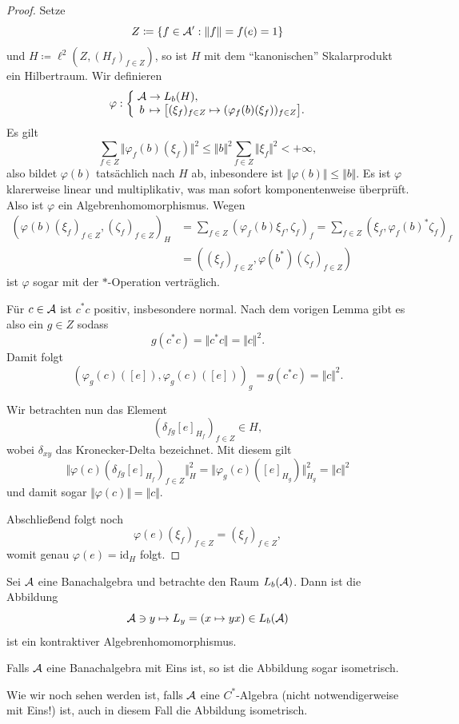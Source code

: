 \begin{proof}
    Setze
    $$ Z \coloneqq \{ f \in \mathcal{A}' : \Vert f \Vert = f(e) = 1 \} $$
    und $H \coloneq \ell^2(Z, (H_f)_{f \in Z})$, so ist $H$ mit dem ``kanonischen'' Skalarprodukt ein Hilbertraum. Wir definieren
    $$ \mapping{\varphi}{\Aa & \to & L_b(H),}{b & \mapsto & \big[ (\xi_f)_{f \in Z} \mapsto (\varphi_f(b)(\xi_f))_{f \in Z} \big].} $$
    Es gilt
    $$ \sum_{f \in Z} \Vert \varphi_f(b) (\xi_f) \Vert^2 \leq \Vert b \Vert^2 \sum_{f \in Z} \Vert \xi_f \Vert^2 < +\infty, $$
    also bildet $\varphi(b)$ tatsächlich nach $H$ ab, inbesondere ist $\Vert \varphi(b) \Vert \leq \Vert b \Vert$. Es ist $\varphi$ klarerweise linear und multiplikativ, was man sofort komponentenweise überprüft. Also ist $\varphi$ ein Algebrenhomomorphismus. Wegen
    \begin{align*}
        (\varphi(b)(\xi_f)_{f \in Z}, (\zeta_f)_{f \in Z})_H &= \sum_{f \in Z} (\varphi_f(b) \xi_f, \zeta_f)_f = \sum_{f \in Z} (\xi_f, \varphi_f(b)^* \zeta_f)_f \\
        &= ((\xi_f)_{f \in Z}, \varphi(b^*) (\zeta_f)_{f \in Z})
    \end{align*}
    ist $\varphi$ sogar mit der $\ast$-Operation verträglich.

    Für $c \in \mathcal{A}$ ist $c^* c$ positiv, insbesondere normal. Nach dem vorigen Lemma gibt es also ein $g \in Z$ sodass
    $$ g(c^* c) = \Vert c^* c \Vert = \Vert c \Vert^2. $$
    Damit folgt
    $$ (\varphi_g(c)([e]), \varphi_g(c)([e]))_g = g(c^* c) = \Vert c \Vert^2. $$

    Wir betrachten nun das Element
    $$ (\delta_{fg} [e]_{H_f})_{f \in Z} \in H, $$
    wobei $\delta_{xy}$ das Kronecker-Delta bezeichnet. Mit diesem gilt
    $$ \Vert \varphi(c) (\delta_{fg} [e]_{H_f})_{f \in Z} \Vert^2_H = \Vert \varphi_g (c) ([e]_{H_g}) \Vert^2_{H_g} = \Vert c \Vert^2 $$
    und damit sogar $\Vert \varphi(c) \Vert = \Vert c \Vert$.

    Abschließend folgt noch
    $$ \varphi(e)(\xi_f)_{f \in Z} = (\xi_f)_{f \in Z}, $$
    womit genau $\varphi(e) = \mathrm{id}_H$ folgt.
\end{proof}

Sei $\mathcal{A}$ eine Banachalgebra und betrachte den Raum $L_b(\mathcal{A})$. Dann ist die Abbildung
$$ \mathcal{A} \ni y \mapsto L_y = (x \mapsto yx) \in L_b(\mathcal{A}) $$
ist ein kontraktiver Algebrenhomomorphismus.

Falls $\mathcal{A}$ eine Banachalgebra mit Eins ist, so ist die Abbildung sogar isometrisch.

Wie wir noch sehen werden ist, falls $\mathcal{A}$ eine $C^*$-Algebra (nicht notwendigerweise mit Eins!) ist, auch in diesem Fall die Abbildung isometrisch.